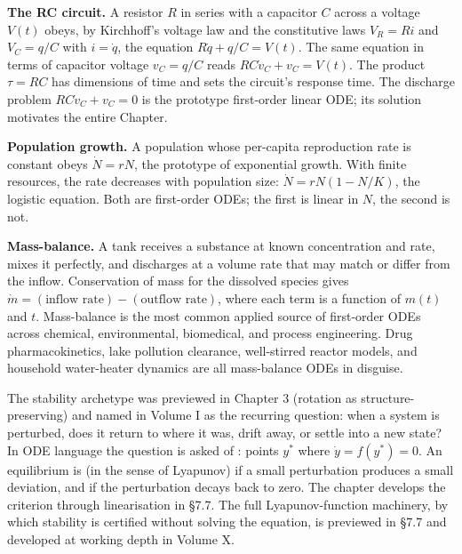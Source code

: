 \textbf{The RC circuit.} A resistor $R$ in series with a capacitor
$C$ across a voltage $V(t)$ obeys, by Kirchhoff's voltage law and
the constitutive laws $V_{R} = R i$ and $V_{C} = q/C$ with $i =
\dot{q}$, the equation $R \dot{q} + q/C = V(t)$. The same equation
in terms of capacitor voltage $v_{C} = q/C$ reads $RC \dot{v}_{C} +
v_{C} = V(t)$. The product $\tau = RC$ has dimensions of time and
sets the circuit's response time. The discharge problem
$RC \dot{v}_{C} + v_{C} = 0$ is the prototype first-order linear
ODE; its solution motivates the entire Chapter.

\textbf{Population growth.} A population whose per-capita
reproduction rate is constant obeys $\dot{N} = r N$, the prototype
of exponential growth. With finite resources, the rate decreases
with population size: $\dot{N} = r N (1 - N/K)$, the logistic
equation. Both are first-order ODEs; the first is linear in $N$, the
second is not.

\textbf{Mass-balance.} A tank receives a substance at known
concentration and rate, mixes it perfectly, and discharges at a
volume rate that may match or differ from the inflow. Conservation
of mass for the dissolved species gives $\dot{m} = (\text{inflow
rate}) - (\text{outflow rate})$, where each term is a function of
$m(t)$ and $t$. Mass-balance is the most common applied source of
first-order ODEs across chemical, environmental, biomedical, and
process engineering. Drug pharmacokinetics, lake pollution
clearance, well-stirred reactor models, and household water-heater
dynamics are all mass-balance ODEs in disguise.

\begin{archetype}
The stability archetype was previewed in Chapter 3 (rotation as
structure-preserving) and named in Volume I as the recurring
question: when a system is perturbed, does it return to where it
was, drift away, or settle into a new state? In ODE language the
question is asked of : points $y^{*}$ where
$\dot{y} = f(y^{*}) = 0$. An equilibrium is  (in
the sense of Lyapunov) if a small perturbation produces a small
deviation, and  if the perturbation
decays back to zero. The chapter develops the criterion through
linearisation in §7.7. The full Lyapunov-function machinery, by
which stability is certified without solving the equation, is
previewed in §7.7 and developed at working depth in Volume X.
\end{archetype}

